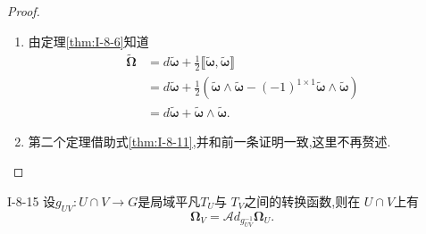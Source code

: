 \documentclass[../main.tex]{subfiles}
\begin{document}
\begin{proof}
  \begin{enumerate}
    \item 由定理\ref{thm:I-8-6}知道 
      \begin{align*}
        \tilde{\bm{\Omega} } &= d \tilde{\bm{\omega} }  + \frac{1}{2} \llbracket \tilde{\bm{\omega} } ,\tilde{\bm{\omega} } \rrbracket\\
                             & = d \bm{\tilde{\omega}} +  \frac{1}{2}(\bm{\tilde{\omega}} \wedge \bm{\tilde{\omega}} -(-1)^{1\times1} \bm{\tilde{\omega}}\wedge \bm{\tilde{\omega}} )\\
                             & = d\bm{\tilde{\omega}} + \bm{\tilde{\omega}} \wedge  \bm{\tilde{\omega}} 
      .\end{align*}
    \item 第二个定理借助式\ref{thm:I-8-11},并和前一条证明一致,这里不再赘述.
  \end{enumerate}
\end{proof}
\begin{theorem}
  {}{I-8-15}
  设$g_{UV}: U\cap V \to G$是局域平凡$T_U$与 $T_V$之间的转换函数,则在 $U\cap V$上有\[
    \bm{\Omega}_V = \mathscr{A}\!d_{g^{-1}_{UV}} \bm{\Omega}_U   
  .\] 
\end{theorem}
\end{document}
